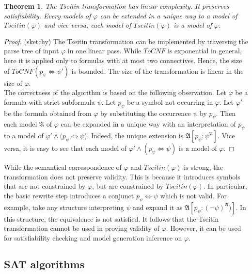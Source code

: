 \documentclass[10pt,a4paper]{article}
\theoremstyle{definition}
\newtheorem{theorem}{Theorem}
\let\iff\Leftrightarrow
\begin{document}
\begin{theorem}
\textit{The Tseitin transformation has linear complexity. It preserves satisfiability. Every models of $\varphi$ can be extended in a unique way to a model of $Tseitin(\varphi)$ and vice versa, each model of $Tseitin(\varphi)$ is a model of $\varphi$.}
\end{theorem}

\begin{proof}
(sketchy) The Tseitin transformation can be implemented by traversing the parse tree of input $\varphi$ in one linear pass. While $ToCNF$ is exponential in general, here it is applied only to formulas with at most two connectives. Hence, the size of $ToCNF(p_\psi \iff \psi')$ is bounded. The size of the transformation is linear in the size of $\varphi$. \\

The correctness of the algorithm is based on the following observation. Let $\varphi$ be a formula with strict subformula $\psi$. Let $p_\psi$ be a symbol not occurring in $\varphi$. Let  $\varphi'$ be the formula obtained from $\varphi$ by substituting the occurrence $\psi$ by $p_\psi$. Then each model $\mathfrak{A}$ of $\varphi$ can be expanded in a unique way with an interpretation of $p_\psi$ to a model of $\varphi' \land (p_\psi \iff \psi$). Indeed, the unique extension is $\mathfrak{A}[p_\psi : \psi^\mathfrak{A}]$. Vice versa, it is easy to see that each model of $\varphi' \land (p_\psi \iff\psi)$ is a model of $\varphi$.
\end{proof}

While the semantical correspondence of $\varphi$ and $Tseitin(\varphi)$ is strong, the transformation does not preserve validity. This is because it introduces symbols that are not constrained by $\varphi$, but are constrained by $Tseitin(\varphi)$. In particular, the basic rewrite step introduces a conjunct $p_\psi\iff\psi$ which is not valid. For example, take any structure interpreting $\psi$ and expand it as $\mathfrak{A}[p_\psi : (\lnot\psi)^\mathfrak{A})]$. In this structure, the equivalence is not satisfied. It follows that the Tseitin transformation cannot be used in proving validity of $\varphi$. However, it can be used for satisfiability checking and model generation inference on $\varphi$.

\subsection{SAT algorithms}
\end{document}
